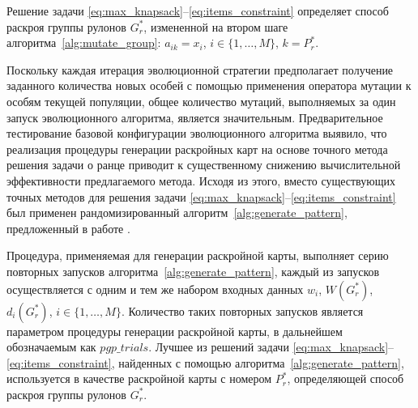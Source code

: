 \documentclass[12pt]{article}
\begin{document}
Решение задачи 
\eqref{eq:max_knapsack}--\eqref{eq:items_constraint} 
определяет способ раскроя группы рулонов $G_r^*$, 
измененной на втором шаге алгоритма~\ref{alg:mutate_group}: 
$a_{ik}=x_i$, $i \in \{1,\ldots,M\}$, $k=P_r^*$.

Поскольку каждая итерация эволюционной стратегии предполагает получение 
заданного количества новых особей с помощью применения оператора мутации к 
особям текущей популяции, общее количество мутаций, выполняемых за один запуск 
эволюционного алгоритма, является значительным. Предварительное тестирование 
базовой конфигурации эволюционного алгоритма выявило, что реализация процедуры 
генерации раскройных карт на основе точного метода решения задачи о ранце 
приводит к существенному снижению вычислительной эффективности предлагаемого 
метода. Исходя из этого, вместо существующих точных методов для решения задачи 
\eqref{eq:max_knapsack}--\eqref{eq:items_constraint} 
был применен рандомизированный алгоритм~\ref{alg:generate_pattern}, 
предложенный в работе 
\cite{bib:vahrenkamp96}. 

Процедура, применяемая для генерации раскройной карты, выполняет серию 
повторных запусков алгоритма~\ref{alg:generate_pattern}, 
каждый из запусков осуществляется с одним и тем же набором входных 
данных $w_i$, $W(G_r^*)$, $d_i(G_r^*)$, $i \in \{1,\ldots,M\}$. Количество 
таких повторных запусков является параметром процедуры генерации раскройной 
карты, в дальнейшем обозначаемым как $pgp\_trials$. Лучшее из решений задачи 
\eqref{eq:max_knapsack}--\eqref{eq:items_constraint}, 
найденных с помощью алгоритма~\ref{alg:generate_pattern}, 
используется в качестве раскройной карты с номером $P_r^*$, определяющей 
способ раскроя группы рулонов $G_r^*$.
\end{document}
